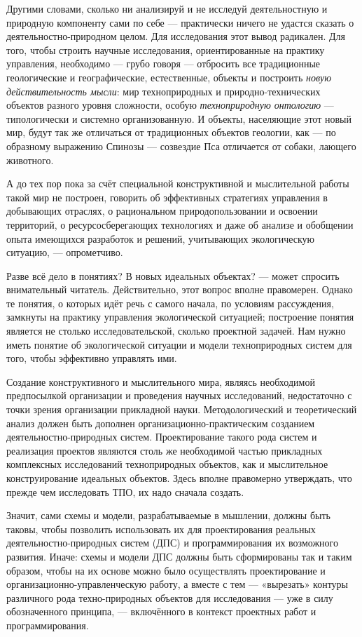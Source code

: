 \documentclass[11pt,a4paper]{article}
\begin{document}
Другими словами, сколько ни анализируй и не исследуй деятельностную и
природную компоненту сами по себе — практически ничего не удастся сказать о
деятельностно-природном целом. Для исследования этот вывод радикален. Для
того, чтобы строить научные исследования, ориентированные на практику
управления, необходимо — грубо говоря — отбросить все традиционные
геологические и географические, естественные, объекты и построить \emph{новую
  действительность мысли}: мир техноприродных и природно-технических объектов
разного уровня сложности, особую \emph{техноприродную онтологию} —
типологически и системно организованную. И объекты, населяющие этот новый мир,
будут так же отличаться от традиционных объектов геологии, как — по образному
выражению Спинозы — созвездие Пса отличается от собаки, лающего животного.

А до тех пор пока за счёт специальной конструктивной и мыслительной работы
такой мир не построен, говорить об эффективных стратегиях управления в
добывающих отраслях, о рациональном природопользовании и освоении территорий,
о ресурсосберегающих технологиях и даже об анализе и обобщении опыта имеющихся
разработок и решений, учитывающих экологическую ситуацию, — опрометчиво. 

Разве всё дело в понятиях? В новых идеальных объектах? — может спросить
внимательный читатель. Действительно, этот вопрос вполне правомерен. Однако те
понятия, о которых идёт речь с самого начала, по условиям рассуждения,
замкнуты на практику управления экологической ситуацией; построение понятия
является не столько исследовательской, сколько проектной задачей. Нам нужно
иметь понятие об экологической ситуации и модели техноприродных систем для
того, чтобы эффективно управлять ими. 

Создание конструктивного и мыслительного мира, являясь необходимой
предпосылкой организации и проведения научных исследований, недостаточно с
точки зрения организации прикладной науки. Методологический и теоретический
анализ должен быть дополнен организационно-практическим созданием
деятельностно-природных систем. Проектирование такого рода систем и реализация
проектов являются столь же необходимой частью прикладных комплексных
исследований техноприродных объектов, как и мыслительное конструирование
идеальных объектов. Здесь вполне правомерно утверждать, что прежде чем
исследовать ТПО, их надо сначала создать. 

Значит, сами схемы и модели, разрабатываемые в мышлении, должны быть таковы,
чтобы позволить использовать их для проектирования реальных
деятельностно-природных систем (ДПС) и программирования их возможного
развития.  Иначе: схемы и модели ДПС должны быть сформированы так и таким
образом, чтобы на их основе можно было осуществлять проектирование и
организационно-управленческую работу, а вместе с тем — «вырезать» контуры
различного рода техно-природных объектов для исследования — уже в силу
обозначенного принципа, — включённого в контекст проектных работ и
программирования.
\end{document}
